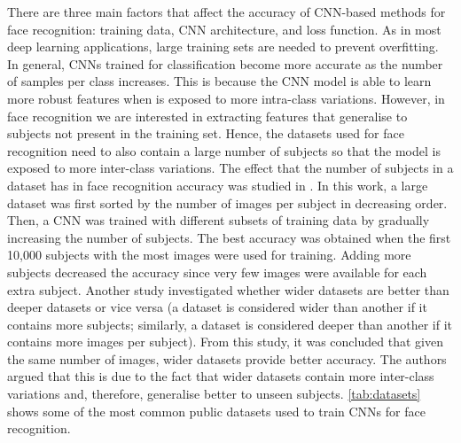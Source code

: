 \documentclass[conference]{IEEEtran}
\begin{document}
There are three main factors that affect the accuracy of CNN-based methods for face recognition: training data, CNN architecture, and loss function. As in most deep learning applications, large training sets are needed to prevent overfitting. In general, CNNs trained for classification become more accurate as the number of samples per class increases. This is because the CNN model is able to learn more robust features when is exposed to more intra-class variations. However, in face recognition we are interested in extracting features that generalise to subjects not present in the training set. Hence, the datasets used for face recognition need to also contain a large number of subjects so that the model is exposed to more inter-class variations. The effect that the number of subjects in a dataset has in face recognition accuracy was studied in \cite{zhou2015naive}. In this work, a large dataset was first sorted by the number of images per subject in decreasing order. Then, a CNN was trained with different subsets of training data by gradually increasing the number of subjects. The best accuracy was obtained when the first 10,000 subjects with the most images were used for training. Adding more subjects decreased the accuracy since very few images were available for each extra subject. Another study \cite{bansal2017s} investigated whether wider datasets are better than deeper datasets or vice versa (a dataset is considered wider than another if it contains more subjects; similarly, a dataset is considered deeper than another if it contains more images per subject). From this study, it was concluded that given the same number of images, wider datasets provide better accuracy. The authors argued that this is due to the fact that wider datasets contain more inter-class variations and, therefore, generalise better to unseen subjects. \cref{tab:datasets} shows some of the most common public datasets used to train CNNs for face recognition.
\end{document}
